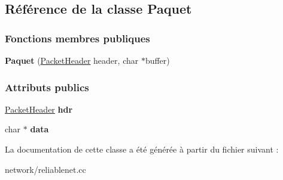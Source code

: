 \hypertarget{class_paquet}{}\subsection{Référence de la classe Paquet}
\label{class_paquet}
\subsubsection*{Fonctions membres publiques}
\begin{DoxyCompactItemize}
\item 
\hypertarget{class_paquet_a30fbcc5179d93efaf360fd240511f15e}{}\label{class_paquet_a30fbcc5179d93efaf360fd240511f15e} 
{\bfseries Paquet} (\hyperlink{class_packet_header}{Packet\+Header} header, char $\ast$buffer)
\end{DoxyCompactItemize}
\subsubsection*{Attributs publics}
\begin{DoxyCompactItemize}
\item 
\hypertarget{class_paquet_a81e301e86676a399d38ceeb1667ee26a}{}\label{class_paquet_a81e301e86676a399d38ceeb1667ee26a} 
\hyperlink{class_packet_header}{Packet\+Header} {\bfseries hdr}
\item 
\hypertarget{class_paquet_a89bc7fef5a2982ad098a34c3a5b8d7b1}{}\label{class_paquet_a89bc7fef5a2982ad098a34c3a5b8d7b1} 
char $\ast$ {\bfseries data}
\end{DoxyCompactItemize}


La documentation de cette classe a été générée à partir du fichier suivant \+:\begin{DoxyCompactItemize}
\item 
network/reliablenet.\+cc\end{DoxyCompactItemize}
